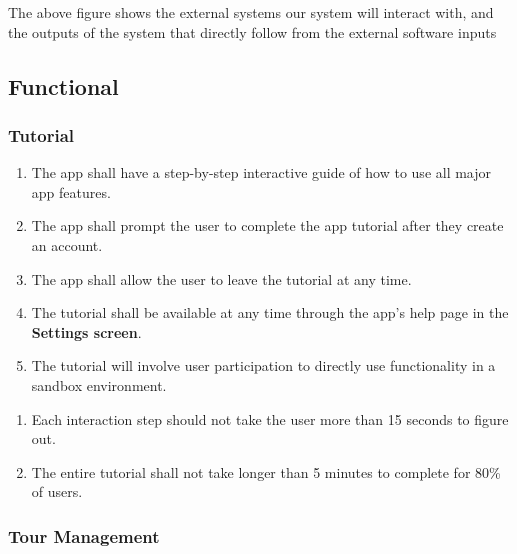 \documentclass{article}
\begin{document}
The above figure shows the external systems our system will interact with, and the outputs of the system that directly follow from the external software inputs

\subsection{Functional}
\label{sub:functional}


\subsubsection{Tutorial}
\label{ssub:tutorial}

\begin{enumerate}[align=left, label=\textbf{TU-FR\arabic*:}]
    \item The app shall have a step-by-step interactive guide of how to use all major app features.
    \item The app shall prompt the user to complete the app tutorial after they create an account.
    \item The app shall allow the user to leave the tutorial at any time.
    \item The tutorial shall be available at any time through the app's help page in the \textbf{Settings screen}.
    \item The tutorial will involve user participation to directly use functionality in a sandbox environment.
\end{enumerate}

\begin{enumerate}[align=left, label=\textbf{TU-NFR\arabic*:}]
    \item Each interaction step should not take the user more than 15 seconds to figure out.
    \item The entire tutorial shall not take longer than 5 minutes to complete for 80\% of users.
\end{enumerate}

\subsubsection{Tour Management}
\label{ssub:tour_management}
\end{document}
